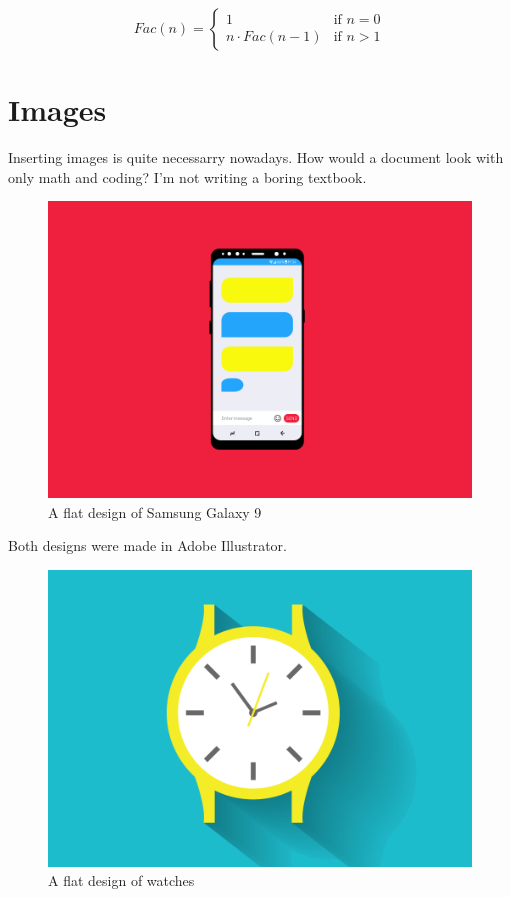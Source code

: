 \documentclass[titlepage, a4paper, 12pt]{article}
\begin{document}
\[
  Fac(n) =
  \begin{cases}
                                   1 & \text{if $n=0$} \\                                   
  n \cdot Fac(n -1) & \text{if $n>1$}
  \end{cases}
\]
\newpage

\section{Images}
Inserting images is quite necessarry nowadays. How would a document look with only math and coding? I'm not writing a boring textbook.

\begin{figure}[h]
\centering
\includegraphics[scale=0.26]{samsung}
\caption{A flat design of Samsung Galaxy 9}
\end{figure}

Both designs were made in Adobe Illustrator.
\begin{figure}[h]
\centering
\includegraphics[scale=0.26]{watches}
\caption{A flat design of watches}
\end{figure}
\end{document}
